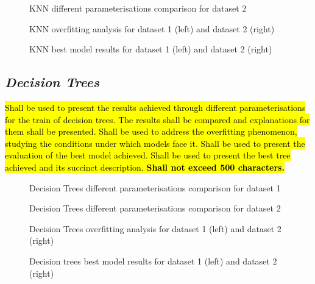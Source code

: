 \documentclass[10pt]{extarticle}
\newcommand{\ctext}[3][RGB]{%
  \begingroup
  \definecolor{hlcolor}{#1}{#2}\sethlcolor{hlcolor}%
  \hl{#3}%
  \endgroup
}
\begin{document}
\begin{figure}[H]
\caption{KNN different parameterisations comparison for dataset 2}
\end{figure}

\begin{figure}[H]
\caption{KNN overfitting analysis for dataset 1 (left) and dataset 2 (right)}
\end{figure}

\begin{figure}[H]
\caption{KNN best model results for dataset 1 (left) and dataset 2 (right)}
\end{figure}

\subsection*{\textit{Decision Trees}}
\ctext[RGB]{190,190,190}{Shall be used to present the results achieved through different parameterisations for the train of decision trees. The results shall be compared and explanations for them shall be presented. Shall be used to address the overfitting phenomenon, studying the conditions under which models face it. Shall be used to present the evaluation of the best model achieved. Shall be used to present the best tree achieved and its succinct description.  \textbf{Shall not exceed 500 characters.}}

\begin{figure}[H]
\caption{Decision Trees different parameterisations comparison for dataset 1}
\end{figure}

\begin{figure}[H]
\caption{Decision Trees different parameterisations comparison for dataset 2}
\end{figure}

\begin{figure}[H]
\caption{Decision Trees overfitting analysis for dataset 1 (left) and dataset 2 (right)}
\end{figure}

\begin{figure}[H]
\caption{Decision trees best model results for dataset 1 (left) and dataset 2 (right)}
\end{figure}
\end{document}
